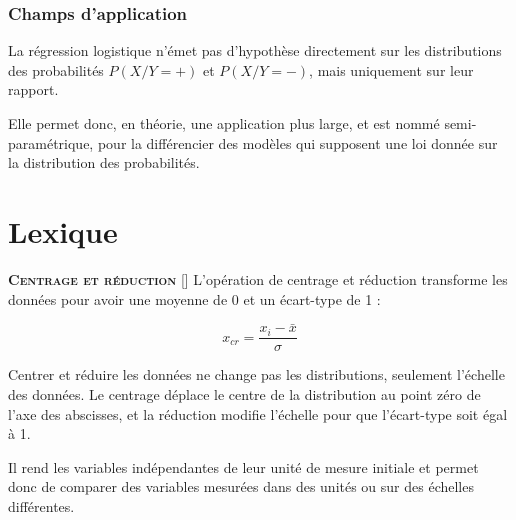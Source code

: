 \documentclass[10pt,french]{report}
\newcommand{\entreelex}[3][]{%
	{\large \textbf{\textsc{#2}}} %
	\if\relax\detokenize{#1}\relax %
	\else %
	\raisebox{0.15ex}{\scalebox{0.7}{$\Diamond$}} %
	[#1] %
	\fi
	\raisebox{0.13ex}{\scalebox{0.75}{$\blacksquare$}} #3 %
}
\begin{document}
	\subsection{Champs d'application}

    La régression logistique n'émet pas d'hypothèse directement sur les distributions des probabilités $P\left(X/Y=+\right)$ et $P\left(X/Y=-\right)$, mais uniquement sur leur rapport.

    Elle permet donc, en théorie, une application plus large, et est nommé semi-paramétrique, pour la différencier des modèles qui supposent une loi donnée sur la distribution des probabilités.


	\chapter{Lexique}

	\label{Centrage et réduction}
	\entreelex{Centrage et réduction}{L'opération de centrage et réduction transforme les données pour avoir une moyenne de 0 et un écart-type de 1 :

	\begin{equation}
		x_{cr}=\frac{x_{i}-\bar{x}}{\sigma}
	\end{equation}

	 Centrer et réduire les données ne change pas les distributions, seulement l'échelle des données. Le centrage déplace le centre de la distribution au point zéro de l'axe des abscisses, et la réduction modifie l'échelle pour que l'écart-type soit égal à 1.

	 Il rend les variables indépendantes de leur unité de mesure initiale et permet donc de comparer des variables mesurées dans des unités ou sur des échelles différentes.}
\end{document}
